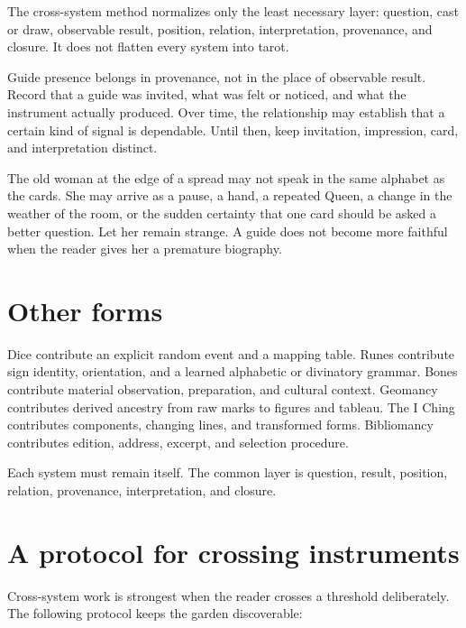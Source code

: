 The cross-system method normalizes only the least necessary layer: question,
cast or draw, observable result, position, relation, interpretation,
provenance, and closure. It does not flatten every system into tarot.

Guide presence belongs in provenance, not in the place of observable result.
Record that a guide was invited, what was felt or noticed, and what the
instrument actually produced. Over time, the relationship may establish that a
certain kind of signal is dependable. Until then, keep invitation, impression,
card, and interpretation distinct.

The old woman at the edge of a spread may not speak in the same alphabet as the
cards. She may arrive as a pause, a hand, a repeated Queen, a change in the
weather of the room, or the sudden certainty that one card should be asked a
better question. Let her remain strange. A guide does not become more faithful
when the reader gives her a premature biography.

\section{Other forms}

Dice contribute an explicit random event and a mapping table. Runes contribute
sign identity, orientation, and a learned alphabetic or divinatory grammar.
Bones contribute material observation, preparation, and cultural context.
Geomancy contributes derived ancestry from raw marks to figures and tableau.
The I Ching contributes components, changing lines, and transformed forms.
Bibliomancy contributes edition, address, excerpt, and selection procedure.

Each system must remain itself. The common layer is question, result, position,
relation, provenance, interpretation, and closure.

\section{A protocol for crossing instruments}

Cross-system work is strongest when the reader crosses a threshold deliberately.
The following protocol keeps the garden discoverable:

